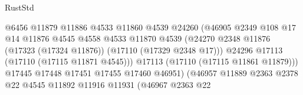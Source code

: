 \begin{lexlean}{RustStd}
\begin{coremodule}
                                                @6456
                                                @11879
                                                @11886
                                                @4533
                                                @11860
                                                @4539
                                                @24260
                                                (@46905
                                                  @2349
                                                  @108
                                                  @17
                                                  @14
                                                  @11876
                                                  @4545
                                                  @4558
                                                  @4533
                                                  @11870
                                                  @4539
                                                  (@24270
                                                    @2348
                                                    @11876
                                                    (@17323 (@17324 @11876))
                                                    (@17110 (@17329 @2348 @17)))
                                                  @24296
                                                  @17113
                                                  (@17110 (@17115 @11871 @4545)))
                                                @17113
                                                (@17110 (@17115 @11861 @11879)))
                                              @17445
                                              @17448
                                              @17451
                                              @17455
                                              @17460
                                              @46951)
                                            (@46957
                                              @11889
                                              @2363
                                              @2378
                                              @22
                                              @4545
                                              @11892
                                              @11916
                                              @11931
                                              (@46967
                                                @2363
                                                @22

\end{coremodule}
\end{lexlean}
